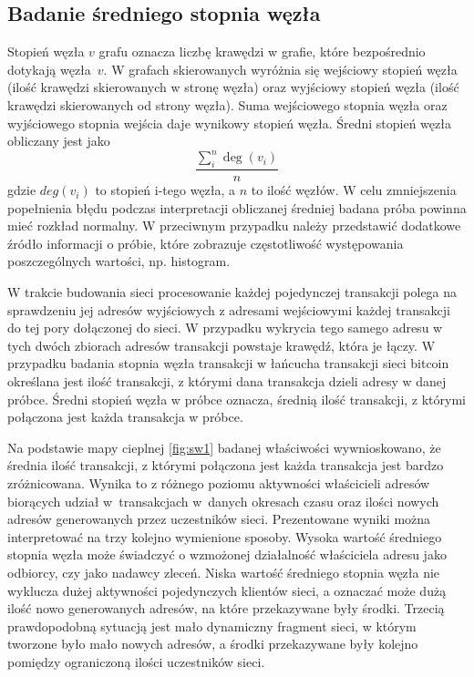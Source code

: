 \documentclass[12pt, twoside, final, openany]{mgr}
\begin{document}
\subsection{Badanie średniego stopnia węzła}
\label{stopien_wezla}
\indent Stopień węzła $v$ grafu oznacza liczbę krawędzi w grafie, które bezpośrednio dotykają węzła~$v$. W grafach skierowanych wyróżnia się wejściowy stopień węzła (ilość krawędzi skierowanych w stronę węzła) oraz wyjściowy stopień węzła (ilość krawędzi skierowanych od strony węzła). Suma wejściowego stopnia węzła oraz wyjściowego stopnia wejścia daje wynikowy stopień węzła. Średni stopień węzła obliczany jest jako 
\begin{equation}
\label{eq:stopien_wezla}
  \frac{\sum_i^n\deg(v_i)}{n}
\end{equation} 
gdzie $deg(v_i)$ to stopień i-tego węzła, a $n$ to ilość węzłów. W celu zmniejszenia popełnienia błędu podczas interpretacji obliczanej średniej badana próba powinna mieć rozkład normalny. W przeciwnym przypadku należy przedstawić dodatkowe źródło informacji o próbie, które zobrazuje częstotliwość występowania poszczególnych wartości, np. histogram. 

\indent W trakcie budowania sieci procesowanie każdej pojedynczej transakcji polega na sprawdzeniu jej adresów wyjściowych z adresami wejściowymi każdej transakcji do tej pory dołączonej do sieci. W przypadku wykrycia tego samego adresu w tych dwóch zbiorach adresów transakcji powstaje krawędź, która je łączy. W przypadku badania stopnia węzła transakcji w łańcucha transakcji sieci bitcoin określana jest ilość transakcji, z którymi dana transakcja dzieli adresy w danej próbce. Średni stopień węzła w próbce oznacza, średnią ilość transakcji, z którymi połączona jest każda transakcja w próbce. 

\indent Na podstawie mapy cieplnej \ref{fig:sw1} badanej właściwości wywnioskowano, że średnia ilość transakcji, z którymi połączona jest każda transakcja jest bardzo zróżnicowana. Wynika to z różnego poziomu aktywności właścicieli adresów biorących udział w~transakcjach w~danych okresach czasu oraz ilości nowych adresów generowanych przez uczestników sieci. Prezentowane wyniki można interpretować na trzy kolejno wymienione sposoby. Wysoka wartość średniego stopnia węzła może świadczyć o wzmożonej działalność właściciela adresu jako odbiorcy, czy jako nadawcy zleceń. Niska wartość średniego stopnia węzła nie wyklucza dużej aktywności pojedynczych klientów sieci, a oznaczać może dużą ilość nowo generowanych adresów, na które przekazywane były środki. Trzecią prawdopodobną sytuacją jest mało dynamiczny fragment sieci, w którym tworzone było mało nowych adresów, a środki przekazywane były kolejno pomiędzy ograniczoną ilości uczestników sieci.
\end{document}
